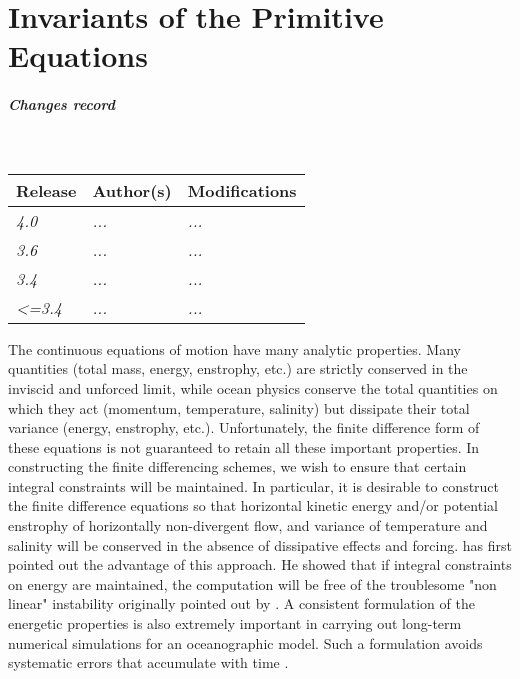 \documentclass[../main/NEMO_manual]{subfiles}
\begin{document}
\chapter{Invariants of the Primitive Equations}
\label{chap:CONS}

\chaptertoc

\paragraph{Changes record} ~\\

{\footnotesize
  \begin{tabularx}{\textwidth}{l||X|X}
    Release & Author(s) & Modifications \\
    \hline
    {\em   4.0} & {\em ...} & {\em ...} \\
    {\em   3.6} & {\em ...} & {\em ...} \\
    {\em   3.4} & {\em ...} & {\em ...} \\
    {\em <=3.4} & {\em ...} & {\em ...}
  \end{tabularx}
}

\clearpage

The continuous equations of motion have many analytic properties.
Many quantities (total mass, energy, enstrophy, etc.) are strictly conserved in the inviscid and unforced limit,
while ocean physics conserve the total quantities on which they act (momentum, temperature, salinity) but
dissipate their total variance (energy, enstrophy, etc.).
Unfortunately, the finite difference form of these equations is not guaranteed to
retain all these important properties.
In constructing the finite differencing schemes, we wish to ensure that
certain integral constraints will be maintained.
In particular, it is desirable to construct the finite difference equations so that
horizontal kinetic energy and/or potential enstrophy of horizontally non-divergent flow,
and variance of temperature and salinity will be conserved in the absence of dissipative effects and forcing.
\citet{arakawa_JCP66} has first pointed out the advantage of this approach.
He showed that if integral constraints on energy are maintained,
the computation will be free of the troublesome "non linear" instability originally pointed out by
\citet{phillips_TAMS59}.
A consistent formulation of the energetic properties is also extremely important in carrying out
long-term numerical simulations for an oceanographic model.
Such a formulation avoids systematic errors that accumulate with time \citep{bryan_JCP97}.
\end{document}

